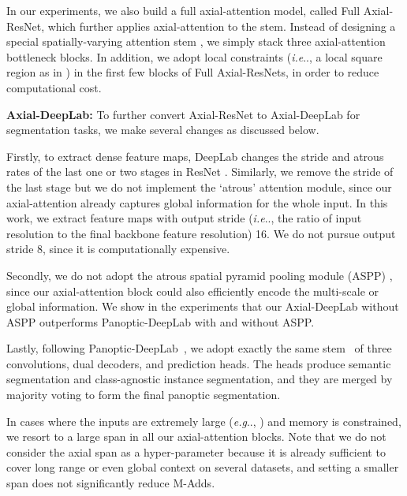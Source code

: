 \documentclass[runningheads]{llncs}
\makeatletter
\DeclareRobustCommand\onedot{\futurelet\@let@token\@onedot}
\def\@onedot{\ifx\@let@token.\else.\null\fi\xspace}
\def\eg{\emph{e.g}\onedot} \def\Eg{\emph{E.g}\onedot}
\def\ie{\emph{i.e}\onedot} \def\Ie{\emph{I.e}\onedot}
\makeatother
\begin{document}
In our experiments, we also build a full axial-attention model, called Full Axial-ResNet, which further applies axial-attention to the stem. Instead of designing a special spatially-varying attention stem \cite{parmar2019stand}, we simply stack three axial-attention bottleneck blocks. In addition, we adopt local constraints (\ie, a local  square region as in \cite{parmar2019stand}) in the first few blocks of Full Axial-ResNets, in order to reduce computational cost.

{\bf Axial-DeepLab:} To further convert Axial-ResNet to Axial-DeepLab for segmentation tasks, we make several changes as discussed below.

Firstly, to extract dense feature maps, DeepLab \cite{deeplabv12015} changes the stride and atrous rates of the last one or two stages in ResNet \cite{he2016deep}. Similarly, we remove the stride of the last stage but we do not implement the `atrous' attention module, since our axial-attention already captures global information for the whole input. In this work, we extract feature maps with output stride (\ie, the ratio of input resolution to the final backbone feature resolution) 16. We do not pursue output stride 8, since it is computationally expensive.

Secondly, we do not adopt the atrous spatial pyramid pooling module (ASPP) \cite{chen2018deeplabv2,chen2017deeplabv3}, since our axial-attention block could also efficiently encode the multi-scale or global information. We show in the experiments that our Axial-DeepLab without ASPP outperforms Panoptic-DeepLab \cite{cheng2019panoptic} with and without ASPP.

Lastly, following Panoptic-DeepLab~\cite{cheng2019panoptic}, we adopt exactly the same stem~\cite{szegedy2016rethinking} of three convolutions, dual decoders, and prediction heads. The heads produce semantic segmentation and class-agnostic instance segmentation, and they are merged by majority voting \cite{yang2019deeperlab} to form the final panoptic segmentation.

In cases where the inputs are extremely large (\eg, ) and memory is constrained, we resort to a large span  in all our axial-attention blocks. Note that we do not consider the axial span as a hyper-parameter because it is already sufficient to cover long range or even global context on several datasets, and setting a smaller span does not significantly reduce M-Adds.
\end{document}
